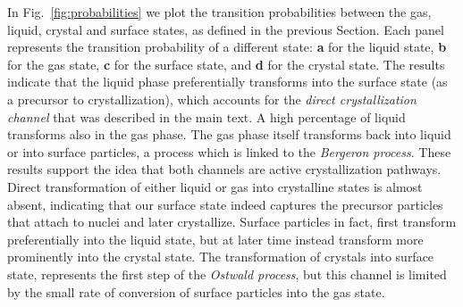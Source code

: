 In Fig.~\ref{fig:probabilities} we plot the transition probabilities between the gas, liquid, crystal
and surface states, as defined in the previous Section. Each panel represents the transition probability
of a different state: {\bf a} for the liquid state, {\bf b} for the gas state, {\bf c} for the surface state,
and {\bf d} for the crystal state. The results indicate that the liquid phase preferentially transforms into
the surface state (as a precursor to crystallization), which accounts for the \emph{direct crystallization channel}
that was described in the main text. A high percentage of liquid transforms also in the gas phase. The gas phase itself
transforms back into liquid or into surface particles, a process which
is linked to the \emph{Bergeron process}. These results support the idea that both channels are active
crystallization pathways. Direct transformation of either liquid or gas into crystalline states is almost absent,
indicating that our surface state indeed captures the precursor particles that attach to nuclei and later crystallize.
Surface particles in fact, first transform preferentially into the liquid state, but at later time instead transform
more prominently into the crystal state. The transformation of crystals into surface state, represents the first
step of the \emph{Ostwald process}, but this channel is limited by the small rate of conversion of surface particles
into the gas state.










